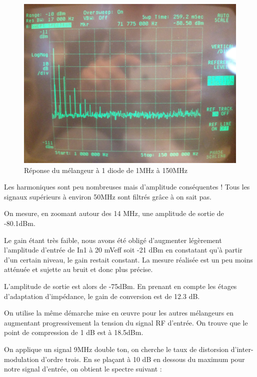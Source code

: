 \documentclass{article}
\begin{document}
\begin{figure}[h!]
	\centering
	\includegraphics[width=.7\textwidth]{11_3_1}
	\caption{Réponse du mélangeur à 1 diode de 1MHz à 150MHz}
	\label{fig:11_3_1}
\end{figure}

Les harmoniques sont peu nombreuses mais d'amplitude conséquentes ! Tous les signaux supérieurs à environ 50MHz sont filtrés grâce à on sait pas.

On mesure, en zoomant autour des 14 MHz, une amplitude de sortie de -80.1dBm.

Le gain étant très faible, nous avons été obligé d'augmenter légèrement l'amplitude d'entrée de In1 à 20 mVeff soit -21 dBm en constatant qu'à partir d'un certain niveau, le gain restait constant. La mesure réalisée est un peu moins atténuée et sujette au bruit et donc plus précise.

L'amplitude de sortie est alors de -75dBm.
En prenant en compte les étages d'adaptation d'impédance, le gain de conversion est de 12.3 dB.


On utilise la même démarche mise en œuvre pour les autres mélangeurs en augmentant progressivement la tension du signal RF d'entrée.
%
On trouve que le point de compression de 1 dB est à 18.5dBm.

On applique un signal 9MHz double ton, on cherche le taux de distorsion d'inter-modulation d'ordre trois.
En se plaçant à 10 dB en dessous du maximum pour notre signal d'entrée, on obtient le spectre suivant :
\end{document}
